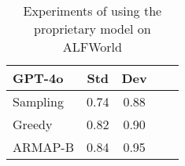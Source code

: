 \begin{table*}[!h]
    \centering
    \begin{tabular}{lcccc}
    \toprule
    GPT-4o    & Std & Dev \\
    \midrule
    Sampling  & 0.74      & 0.88 &  \\
    Greedy  & 0.82      & 0.90 &  \\
    ARMAP-B & 0.84 & 0.95  \\
    \bottomrule
    \end{tabular}
    \caption{Experiments of using the proprietary model on ALFWorld}
    \label{tab:api_model}
\end{table*}
